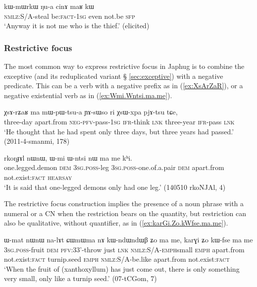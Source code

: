  \begin{exe}
\ex \label{ex:Nua.cinA.maR.kW}
\gll  kɯ-mɯrkɯ ŋu-a cinɤ maʁ kɯ  \\
\textsc{nmlz}:S/A-steal be:\textsc{fact}-\textsc{1sg} even not.be \textsc{sfp} \\
\glt `Anyway it is not me who is the thief.' (elicited)
\end{exe}

\subsubsection{Restrictive focus} \label{sec:restrictive.focus} 
 The most common way to express restrictive focus in Japhug is to combine the exceptive  (and its reduplicated variant  § \ref{sec:exceptive}) with a negative predicate. This can be a verb with a negative prefix as in (\ref{ex:XsArZaR}), or a negative existential verb as in (\ref{ex:Wmi.Wntsi.ma.me}).
 
 \begin{exe}
\ex  \label{ex:XsArZaR}
\gll   χsɤ-rʑaʁ ma mɯ-pɯ-tsu-a ɲɤ-sɯso ri χsɯ-xpa pjɤ-tsu tɕe,  \\
three-day apart.from \textsc{neg}-\textsc{pfv}-pass-\textsc{1sg} \textsc{ifr}-think \textsc{lnk} three-year \textsc{ifr}-pass \textsc{lnk} \\
\glt `He thought that he had spent only three days, but three years had passed.' (2011-4-smanmi, 178)
  \end{exe}
  
  \begin{exe}
\ex  \label{ex:Wmi.Wntsi.ma.me}
\gll  rkoŋɟɤl nɯnɯ, ɯ-mi ɯ-ntsi nɯ ma me kʰi.   \\
one.legged.demon \textsc{dem} \textsc{3sg}.\textsc{poss}-leg \textsc{3sg}.\textsc{poss}-one.of.a.pair \textsc{dem} apart.from not.exist:\textsc{fact} \textsc{hearsay} \\
\glt  `It is said that one-legged demons only had one leg.' (140510 rkoNJAl, 4)
  \end{exe}
  
The restrictive focus construction implies the presence of a noun phrase with a numeral or a CN when the restriction bears on the quantity, but restriction can also be qualitative, without quantifier, as in (\ref{ex:karGi.Zo.kWfse.ma.me}).

\begin{exe}
\ex \label{ex:karGi.Zo.kWfse.ma.me}
 \gll   ɯ-mat nɯnɯ na-lɤt ɕɯmɯma nɤ kɯ-ndɯ\redp{}ndɯβ ʑo ma me, karɣi ʑo kɯ-fse ma me  \\
 \textsc{3sg}.\textsc{poss}-fruit \textsc{dem} \textsc{pfv}:3\fl{}3'-throw just \textsc{lnk}  \textsc{nmlz}:S/A-\textsc{emph}\redp{}small \textsc{emph} apart.from not.exist:\textsc{fact} turnip.seed \textsc{emph} \textsc{nmlz}:S/A-be.like apart.from not.exist:\textsc{fact} \\
 \glt  `When the fruit of (xanthoxyllum) has just come out, there is only something very small, only like a turnip seed.'  (07-tCGom, 7)
  \end{exe}
  
